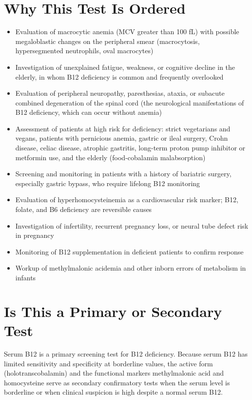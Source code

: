 \section*{Why This Test Is Ordered}
\begin{itemize}
  \item Evaluation of macrocytic anemia (MCV greater than 100 fL) with possible megaloblastic changes on the peripheral smear (macrocytosis, hypersegmented neutrophils, oval macrocytes)
  \item Investigation of unexplained fatigue, weakness, or cognitive decline in the elderly, in whom B12 deficiency is common and frequently overlooked
  \item Evaluation of peripheral neuropathy, paresthesias, ataxia, or subacute combined degeneration of the spinal cord (the neurological manifestations of B12 deficiency, which can occur without anemia)
  \item Assessment of patients at high risk for deficiency: strict vegetarians and vegans, patients with pernicious anemia, gastric or ileal surgery, Crohn disease, celiac disease, atrophic gastritis, long-term proton pump inhibitor or metformin use, and the elderly (food-cobalamin malabsorption)
  \item Screening and monitoring in patients with a history of bariatric surgery, especially gastric bypass, who require lifelong B12 monitoring
  \item Evaluation of hyperhomocysteinemia as a cardiovascular risk marker; B12, folate, and B6 deficiency are reversible causes
  \item Investigation of infertility, recurrent pregnancy loss, or neural tube defect risk in pregnancy
  \item Monitoring of B12 supplementation in deficient patients to confirm response
  \item Workup of methylmalonic acidemia and other inborn errors of metabolism in infants
\end{itemize}

\section*{Is This a Primary or Secondary Test}
Serum B12 is a primary screening test for B12 deficiency. Because serum B12 has limited sensitivity and specificity at borderline values, the active form (holotranscobalamin) and the functional markers methylmalonic acid and homocysteine serve as secondary confirmatory tests when the serum level is borderline or when clinical suspicion is high despite a normal serum B12.


